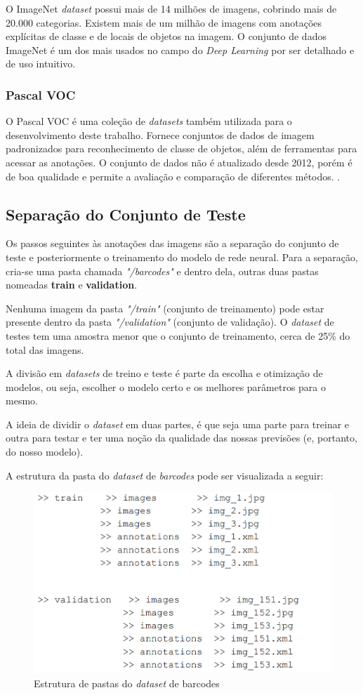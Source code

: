 O ImageNet \textit{dataset} \cite{deng2009imagenet} possui mais de 14 milhões de imagens, cobrindo mais de 20.000 categorias. Existem mais de um milhão de imagens com anotações explícitas de classe e de locais de objetos na imagem. O conjunto de dados ImageNet é um dos mais usados no campo do \textit{Deep Learning} por ser detalhado e de uso intuitivo. \cite{zhou2017application}

\subsubsection*{Pascal VOC}
O Pascal VOC é uma coleção de \textit{datasets} também utilizada para o desenvolvimento deste trabalho. Fornece conjuntos de dados de imagem padronizados para reconhecimento de classe de objetos, além de ferramentas para acessar as anotações. O conjunto de dados não é atualizado desde 2012, porém é de boa qualidade e permite a avaliação e comparação de diferentes métodos. \cite{zhou2017application, everingham2010pascal}.


\subsection{Separação do Conjunto de Teste}

Os passos seguintes às anotações das imagens são a separação do conjunto de teste e posteriormente o treinamento do modelo de rede neural. Para a separação, cria-se uma pasta chamada \textit{"/barcodes"} e dentro dela, outras duas pastas nomeadas \textbf{train} e \textbf{validation}.

Nenhuma imagem da pasta \textit{"/train"} (conjunto de treinamento) pode estar presente dentro da pasta \textit{"/validation"} (conjunto de validação). O \textit{dataset} de testes tem uma amostra menor que o conjunto de treinamento, cerca de 25\% do total das imagens.

A divisão em \textit{datasets} de treino e teste é parte da escolha e otimização de modelos, ou seja, escolher o modelo certo e os melhores parâmetros para o mesmo.

A ideia de dividir o \textit{dataset} em duas partes, é que seja uma parte para treinar e outra para testar e ter uma noção da qualidade das nossas previsões (e, portanto, do nosso modelo).

A estrutura da pasta do \textit{dataset} de \textit{barcodes} pode ser visualizada a seguir:

\begin{figure}[H]
	\centering
	\includegraphics[width=0.5\linewidth]{figuras/MachineLearning/foldersDataset.png}
	\caption{Estrutura de pastas do \textit{dataset} de barcodes}
	\label{fig:foldersDataset}
\end{figure}

